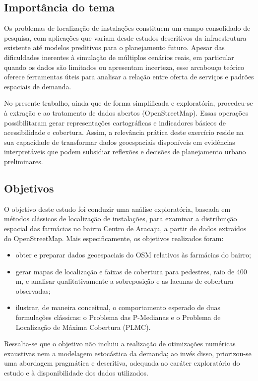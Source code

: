 \documentclass[12pt]{article}
\begin{document}
\subsection{Importância do tema}

Os problemas de localização de instalações constituem um campo consolidado de pesquisa, com aplicações que variam desde estudos descritivos da infraestrutura existente até modelos preditivos para o planejamento futuro. Apesar das dificuldades inerentes à simulação de múltiplos cenários reais, em particular quando os dados são limitados ou apresentam incerteza, esse arcabouço teórico oferece ferramentas úteis para analisar a relação entre oferta de serviços e padrões espaciais de demanda.  

No presente trabalho, ainda que de forma simplificada e exploratória, procedeu-se à extração e ao tratamento de dados abertos (OpenStreetMap). Essas operações possibilitaram gerar representações cartográficas e indicadores básicos de acessibilidade e cobertura. Assim, a relevância prática deste exercício reside na sua capacidade de transformar dados geoespaciais disponíveis em evidências interpretáveis que podem subsidiar reflexões e decisões de planejamento urbano preliminares.

\subsection{Objetivos}

O objetivo deste estudo foi conduzir uma análise exploratória, baseada em métodos clássicos de localização de instalações, para examinar a distribuição espacial das farmácias no bairro Centro de Aracaju, a partir de dados extraídos do OpenStreetMap. Mais especificamente, os objetivos realizados foram:

\begin{itemize}
    \item obter e preparar dados geoespaciais do OSM relativos às farmácias do bairro;
    \item gerar mapas de localização e faixas de cobertura para pedestres, raio de 400\,m, e analisar qualitativamente a sobreposição e as lacunas de cobertura observadas;
    \item ilustrar, de maneira conceitual, o comportamento esperado de duas formulações clássicas: o Problema das P-Medianas e o Problema de Localização de Máxima Cobertura (PLMC).
\end{itemize}

Ressalta-se que o objetivo não incluiu a realização de otimizações numéricas exaustivas nem a modelagem estocástica da demanda; ao invés disso, priorizou-se uma abordagem pragmática e descritiva, adequada ao caráter exploratório do estudo e à disponibilidade dos dados utilizados.
\end{document}
